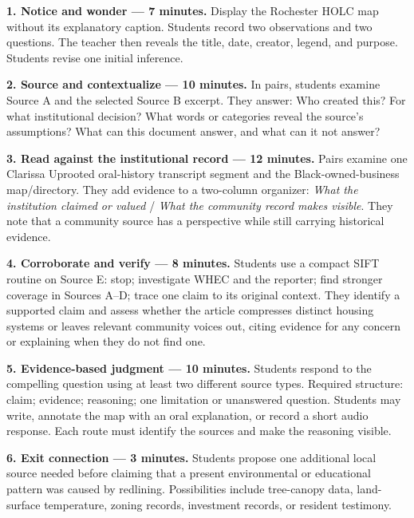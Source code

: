 \documentclass[11pt]{article}
\newcommand{\subsectiontitle}[1]{\par\Needspace{4\baselineskip}\addvspace{0.08in}\noindent{\large\bfseries\color{DeepNavy}#1}\par}
\begin{document}
\subsectiontitle{Sequence}
\textbf{1. Notice and wonder --- 7 minutes.} Display the Rochester HOLC map without its explanatory caption. Students record two observations and two questions. The teacher then reveals the title, date, creator, legend, and purpose. Students revise one initial inference.

\textbf{2. Source and contextualize --- 10 minutes.} In pairs, students examine Source A and the selected Source B excerpt. They answer: Who created this? For what institutional decision? What words or categories reveal the source's assumptions? What can this document answer, and what can it not answer?

\textbf{3. Read against the institutional record --- 12 minutes.} Pairs examine one Clarissa Uprooted oral-history transcript segment and the Black-owned-business map/directory. They add evidence to a two-column organizer: \emph{What the institution claimed or valued} / \emph{What the community record makes visible}. They note that a community source has a perspective while still carrying historical evidence.

\textbf{4. Corroborate and verify --- 8 minutes.} Students use a compact SIFT routine on Source E: stop; investigate WHEC and the reporter; find stronger coverage in Sources A--D; trace one claim to its original context. They identify a supported claim and assess whether the article compresses distinct housing systems or leaves relevant community voices out, citing evidence for any concern or explaining when they do not find one.

\textbf{5. Evidence-based judgment --- 10 minutes.} Students respond to the compelling question using at least two different source types. Required structure: claim; evidence; reasoning; one limitation or unanswered question. Students may write, annotate the map with an oral explanation, or record a short audio response. Each route must identify the sources and make the reasoning visible.

\textbf{6. Exit connection --- 3 minutes.} Students propose one additional local source needed before claiming that a present environmental or educational pattern was caused by redlining. Possibilities include tree-canopy data, land-surface temperature, zoning records, investment records, or resident testimony.
\end{document}
